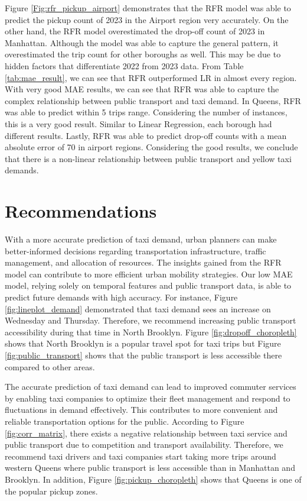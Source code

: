 \documentclass[11pt]{article}
\begin{document}
Figure \ref{Fig:rfr_pickup_airport} demonstrates that the RFR model was able to predict the pickup count of 2023 in the Airport region very accurately. On the other hand, the RFR model overestimated the drop-off count of 2023 in Manhattan. Although the model was able to capture the general pattern, it overestimated the trip count for other boroughs as well. This may be due to hidden factors that differentiate 2022 from 2023 data. From Table \ref{tab:mae_result}, we can see that RFR outperformed LR in almost every region. With very good MAE results, we can see that RFR was able to capture the complex relationship between public transport and taxi demand. In Queens, RFR was able to predict within 5 trips range. Considering the number of instances, this is a very good result. Similar to Linear Regression, each borough had different results. Lastly, RFR was able to predict drop-off counts with a mean absolute error of 70 in airport regions. Considering the good results, we conclude that there is a non-linear relationship between public transport and yellow taxi demands.

\section{Recommendations}

With a more accurate prediction of taxi demand, urban planners can make better-informed decisions regarding transportation infrastructure, traffic management, and allocation of resources. The insights gained from the RFR model can contribute to more efficient urban mobility strategies. Our low MAE model, relying solely on temporal features and public transport data, is able to predict future demands with high accuracy. For instance, Figure \ref{fig:lineplot_demand} demonstrated that taxi demand sees an increase on Wednesday and Thursday. Therefore, we recommend increasing public transport accessibility during that time in North Brooklyn. Figure \ref{fig:dropoff_choropleth} shows that North Brooklyn is a popular travel spot for taxi trips but Figure \ref{fig:public_transport} shows that the public transport is less accessible there compared to other areas. 

The accurate prediction of taxi demand can lead to improved commuter services by enabling taxi companies to optimize their fleet management and respond to fluctuations in demand effectively. This contributes to more convenient and reliable transportation options for the public. According to Figure \ref{fig:corr_matrix}, there exists a negative relationship between taxi service and public transport due to competition and transport availability. Therefore, we recommend taxi drivers and taxi companies start taking more trips around western Queens where public transport is less accessible than in Manhattan and Brooklyn. In addition, Figure \ref{fig:pickup_choropleth} shows that Queens is one of the popular pickup zones. 
\end{document}
